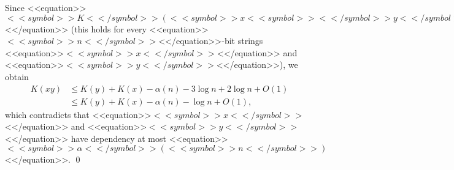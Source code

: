 \documentclass[proceedings]{stacs}
\begin{document}
Since <<equation>>$<<symbol>>K<</symbol>>(<<symbol>>x<<symbol>><</symbol>>y<</symbol>>) \leq <<symbol>>K<</symbol>>(<<symbol>>y<</symbol>>) + <<symbol>>K<</symbol>>(<<symbol>>x<</symbol>> \mid <<symbol>>y<</symbol>>) + 2 \log <<symbol>>n<</symbol>> + <<symbol>>O<</symbol>>(1)$<</equation>> (this holds for every <<equation>>$<<symbol>>n<</symbol>>$<</equation>>-bit strings <<equation>>$<<symbol>>x<</symbol>>$<</equation>> and <<equation>>$<<symbol>>y<</symbol>>$<</equation>>), we obtain
\[
\begin{array}{ll}
K(x y) & \leq K(y) + K(x) - \alpha(n) - 3 \log n + 2 \log n + O(1) \\
& \leq K(y) + K(x) - \alpha(n) - \log n + O(1),
\end{array}
\]
which contradicts that <<equation>>$<<symbol>>x<</symbol>>$<</equation>> and <<equation>>$<<symbol>>y<</symbol>>$<</equation>> have dependency at most <<equation>>$<<symbol>>\alpha<</symbol>>(<<symbol>>n<</symbol>>)$<</equation>>.
\qed
\end{document}
